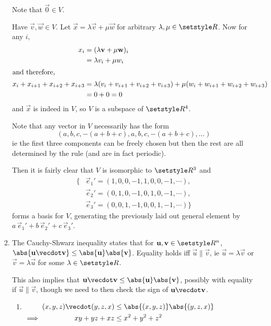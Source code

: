 \documentclass[fleqn,a4paper,11pt]{article}
\begin{document}
\begin{enumerate}[label=\textbf{\arabic*.}]
    Note that \(\vec 0 \in V\).

    Have \(\vec v, \vec w \in V\). Let \(\vec x = \lambda \vec v + \mu \vec w\)
    for arbitrary \(\lambda, \mu \in \Reals\). Now for any \(i\),
    \begin{align*}
     x_i &= (\lambda \vec v + \mu \vec w)_i \\
         &= \lambda v_i + \mu w_i \\
     \intertext{and therefore,}
     x_i + x_{i + 1} + x_{i + 2} + x_{i + 3} &=
      \lambda(v_i + v_{i + 1} + v_{i + 2} + v_{i + 3}) +
      \mu(w_i + w_{i + 1} + w_{i + 2} + w_{i + 3}) \\
      &= 0 + 0 = 0
    \end{align*}
    and \(\vec x\) is indeed in \(V\), so \(V\) is a subspace of \(\Reals^4\).

    Note that any vector in \(V\) necessarily has the form
    \begin{equation*}
     (a, b, c, -(a + b + c), a, b, c, -(a + b + c), \dotsc)
    \end{equation*}
    ie the first three components can be freely chosen but then the rest are all
    determined by the rule (and are in fact periodic).

    Then it is fairly clear that \(V\) is isomorphic to \(\Reals^3\) and
    \begin{align*}
     \{&\vec e_1' =
        (1, 0, 0, -1, 1, 0, 0, -1, \cdots), \\
       &\vec e_2' =
        (0, 1, 0, -1, 0, 1, 0, -1, \cdots), \\
       &\vec e_3' =
        (0, 0, 1, -1, 0, 0, 1, -1, \cdots)\}
    \end{align*}
    forms a basis for \(V\), generating the previously laid out general element
    by \(a\,\vec e_1' + b\,\vec e_2' + c\,\vec e_3'\).
   \item
    The Cauchy-Shwarz inequality states that for
    \(\vec u, \vec v \in \Reals^n\),
    \(\abs{\vec u \vecdot \vec v} \le \abs{\vec u} \abs{\vec v}\).
    Equality holds iff \(\vec u \parallel \vec v\), ie
    \(\vec u = \lambda \vec v\) or \(\vec v = \lambda \vec u\) for some
    \(\lambda \in \Reals\).

    This also implies that
    \(\vec u \vecdot \vec v \le \abs{\vec u} \abs{\vec v}\),
    possibly with equality if \(\vec u \parallel \vec v\), though we need to
    then check the sign of \(\vec u \vecdot \vec v\).
    \begin{enumerate}[label=(\alph*)]
     \item \(
      \begin{alignedat}[t]2
       && (x, y, z) \vecdot (y, z, x) &\le \abs{(x, y, z)} \abs{(y, z, x)} \\
       \implies{}&& xy + yz + xz &\le x^2 + y^2 + z^2
      \end{alignedat} \)


\end{enumerate}
\end{enumerate}
\end{document}

